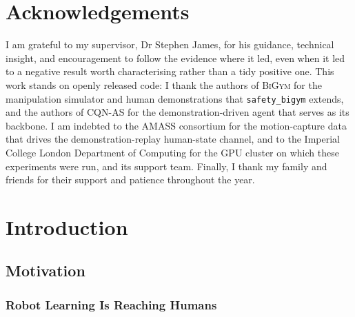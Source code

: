 \documentclass[11pt,a4paper]{report}
\newcommand{\bigym}{\textsc{BiGym}}
\newcommand{\sbigym}{\texttt{safety\_bigym}}
\newcommand{\cqnas}{CQN-AS}
\begin{document}
\tableofcontents
\listoffigures
\listoftables

\chapter*{Acknowledgements}
I am grateful to my supervisor, Dr Stephen James, for his guidance,
technical insight, and encouragement to follow the evidence where it
led, even when it led to a negative result worth characterising rather
than a tidy positive one. This work stands on openly released code: I
thank the authors of \bigym{} for the manipulation simulator and human
demonstrations that \sbigym{} extends, and the authors of \cqnas{} for
the demonstration-driven agent that serves as its backbone. I am
indebted to the \textsc{AMASS} consortium for the motion-capture data
that drives the demonstration-replay human-state channel, and to the Imperial College London
Department of Computing for the GPU cluster on which these experiments
were run, and its support team. Finally, I thank my family and friends
for their support and patience throughout the year.

\chapter{Introduction}
\label{ch:intro}

\section{Motivation}
\label{sec:intro:motivation}

\subsection{Robot Learning Is Reaching Humans}
\label{sec:intro:mot:reaching}
\end{document}
